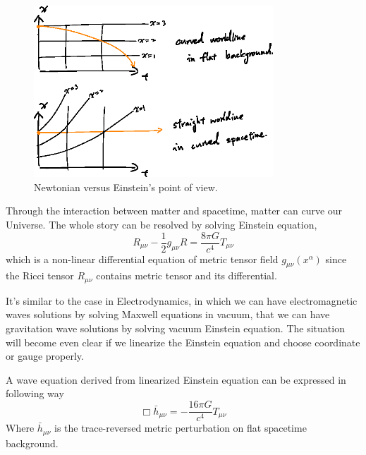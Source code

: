 \begin{figure}[hbt!]
\centering
\includegraphics[width=0.8\textwidth]{figure/gr/curvedxt.eps}
\caption{Newtonian versus Einstein's point of view. }\label{fig:grxt}
\end{figure}


Through the interaction between matter and spacetime, matter can curve our Universe. The whole story can be resolved by solving Einstein equation,
\begin{equation}
\label{eq:einsteineq}
    R_{\mu\nu}-\frac{1}{2}g_{\mu\nu}R = \frac{8 \pi G}{c^4} T_{\mu\nu}
\end{equation}
which is a non-linear differential equation of metric tensor field $g_{\mu\nu}(x^{\alpha})$ since the Ricci tensor $R_{\mu\nu}$ contains metric tensor and its differential.

It's similar to the case in Electrodynamics, in which we can have electromagnetic waves solutions by solving Maxwell equations in vacuum, that we can have gravitation wave solutions by solving vacuum Einstein equation. The situation will become even clear if we linearize the Einstein equation and choose coordinate or gauge properly.

 
A wave equation derived from linearized Einstein equation can be expressed in following way
\begin{equation}
    \Box \bar{h}_{\mu\nu} = - \frac{16\pi G}{c^4}T_{\mu\nu}
\end{equation}
Where $\bar{h}_{\mu\nu}$ is the trace-reversed metric perturbation on flat spacetime background.


